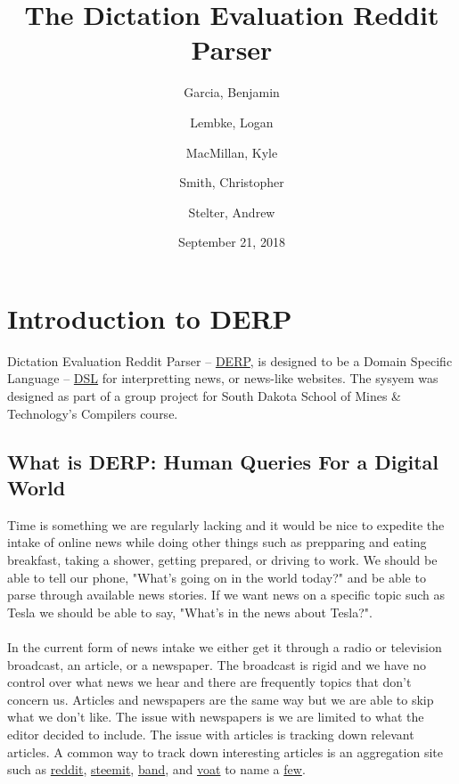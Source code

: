 \documentclass{article}
\title{\textbf{The Dictation Evaluation Reddit Parser}}
\author{
Garcia, Benjamin \and
Lembke, Logan \and 
MacMillan, Kyle  \and 
Smith, Christopher \and 
Stelter, Andrew 
}
\date{September 21, 2018}
\begin{document}
\maketitle

\newpage

\tableofcontents
{}


\newpage
{}  %

\section{\textbf{Introduction to DERP}}
\setcounter{page}{1} %
Dictation Evaluation Reddit Parser -- \href{https://gitlab.mcs.sdsmt.edu/7184015/DERP}{DERP}, is designed to be a Domain Specific Language -- \href{https://en.wikipedia.org/wiki/Domain-specific_language}{DSL} for interpretting news, or news-like websites. The sysyem was designed as part of a group project for South Dakota School of Mines \& Technology's Compilers course.

\subsection{What is DERP: Human Queries For a Digital World}
Time is something we are regularly lacking and it would be nice to expedite the intake of online news while doing other things such as prepparing and eating breakfast, taking a shower, getting prepared, or driving to work. We should be able to tell our phone, "What's going on in the world today?" and be able to parse through available news stories. If we want news on a specific topic such as Tesla we should be able to say, "What's in the news about Tesla?". \\ \\
In the current form of news intake we either get it through a radio or television broadcast, an article, or a newspaper. The broadcast is rigid and we have no control over what news we hear and there are frequently topics that don't concern us. Articles and newspapers are the same way but we are able to skip what we don't like. The issue with newspapers is we are limited to what the editor decided to include. The issue with articles is tracking down relevant articles. A common way to track down interesting articles is an aggregation site such as \href{https://www.reddit.com}{reddit}, \href{https://steemit.com/}{steemit}, \href{https://band.us/home}{band}, and \href{https://voat.co/}{voat} to name a \href{https://www.reddit.com/r/RedditAlternatives/comments/8585ox/list_of_active_reddit_alternatives/}{few}.
\end{document}
